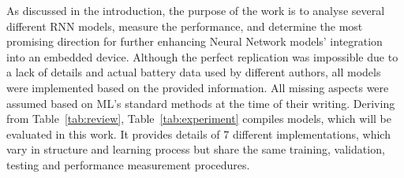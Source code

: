 As discussed in the introduction, the purpose of the work is to analyse several different RNN models, measure the performance, and determine the most promising direction for further enhancing Neural Network models' integration into an embedded device.
Although the perfect replication was impossible due to a lack of details and actual battery data used by different authors, all models were implemented based on the provided information.
All missing aspects were assumed based on ML's standard methods at the time of their writing.
Deriving from \mbox{Table~\ref{tab:review}}, \mbox{Table~\ref{tab:experiment}} compiles models, which will be evaluated in this work.
It provides details of 7 different implementations, which vary in structure and learning process but share the same training, validation, testing and performance measurement procedures.
